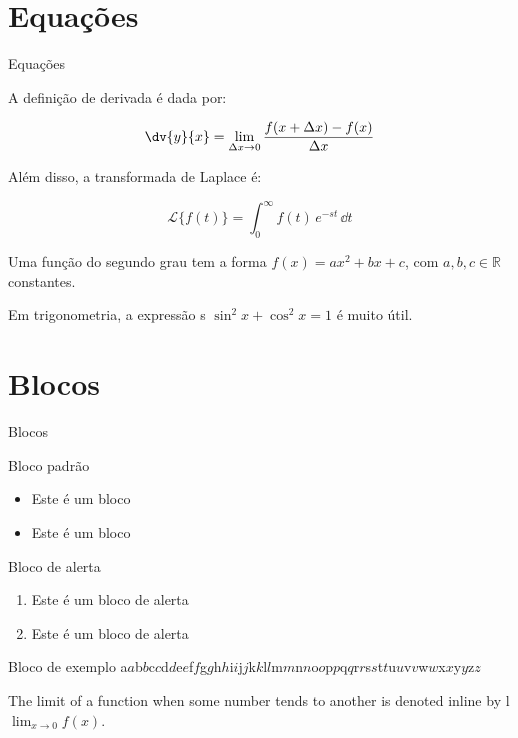 \section{Equações}

\begin{frame}{Equações}

A definição de derivada é dada por:

\begin{equation}
    \dv{y}{x} = \lim_{\Delta x\to 0} \frac{f(x + \Delta x) - f(x)}{\Delta x}
\end{equation}

Além disso, a transformada de Laplace é:

\begin{equation}
    \mathcal{L}\{f(t)\} = \int_0^{\infty} f(t) \, e^{-st} \, \dd{t}
\end{equation}

Uma função do segundo grau tem a forma \(f(x) = ax^2+bx+c\), com \(a,b,c \in \mathbb{R}\) constantes.

Em trigonometria, a expressão s \(\sin^2x+\cos^2x = 1\) é muito útil.
    
\end{frame}

\section{Blocos}

\begin{frame}{Blocos}
    \begin{block}{Bloco padrão}
        \begin{itemize}
            \item Este é um bloco
            \item Este é um bloco
        \end{itemize}
    \end{block}

    \begin{alertblock}{Bloco de alerta}
        \begin{enumerate}
            \item Este é um bloco de alerta
            \item Este é um bloco de alerta    
        \end{enumerate}
    \end{alertblock}

    \begin{exampleblock}{Bloco de exemplo}
        a$a$b$b$c$c$d$d$e$e$f$f$g$g$h$h$i$i$j$j$k$k$l$l$m$m$n$n$o$o$p$p$q$q$r$r$s$s$t$t$u$u$v$v$w$w$x$x$y$y$z$z$
    \end{exampleblock}

\end{frame}

\begin{frame}
    The limit of a function when some number tends to another is denoted inline by l \(\lim_{x\to 0} f(x)\).
\end{frame}